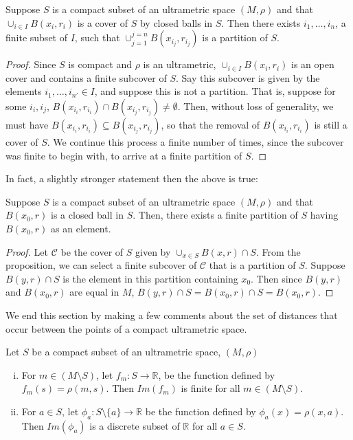 \begin{proposition}
Suppose $S$ is a compact subset of an ultrametric space $(M, \rho)$ and that $\cup_{i \in I} B(x_i,r_i)$ is a cover of $S$ by closed balls in $S$. Then there exists $i_1,\ldots, i_n$, a finite subset of $I$, such that  $\cup_{j=1}^{j=n} B(x_{i_j},r_{i_j})$ is a partition of $S$.
\end{proposition}

\begin{proof}
Since $S$ is compact and $\rho$ is an ultrametric, $\cup_{i \in I} B(x_i,r_i)$ is an open cover and contains a finite subcover of $S$. Say this subcover is given by the elements  $i_1,\ldots, i_{n'} \in I$, and suppose this is not a partition. That is, suppose for some $i_i, i_j$, $ B(x_{i_i},r_{i_i}) \cap  B(x_{i_j},r_{i_j}) \neq \emptyset$. Then, without loss of generality, we must have $ B(x_{i_i},r_{i_i}) \subseteq  B(x_{i_j},r_{i_j})$, so that the removal of $ B(x_{i_i},r_{i_i})$ is still a cover of $S$. We continue this process a finite number of times, since the subcover was finite to begin with, to arrive at a finite partition of $S$.
\end{proof}

In fact, a slightly stronger statement then the above is true:\\

\begin{corollary}
Suppose $S$ is a compact subset of an ultrametric space $(M, \rho)$ and that $B(x_0,r)$ is a closed ball in $S$. Then, there exists a finite partition of $S$ having $B(x_0,r)$ as an element.
\end{corollary}

\begin{proof}
Let $\mathcal{C}$ be the cover of $S$ given by $\cup_{x\in S} B(x,r) \cap S$. From the proposition, we can select a finite subcover of $\mathcal{C}$ that is a partition of $S$. Suppose $B(y,r) \cap S$ is the element in this partition containing $x_0$. Then  since $B(y,r)$ and $B(x_0,r)$ are equal in $M$, $B(y,r) \cap S = B(x_0,r) \cap S = B(x_0,r)$.
\end{proof}

We end this section by making a few comments about the set of distances that occur between the points of a compact ultrametric space.\\

\begin{proposition}
\cite{ar} Let $S$ be a compact subset of an ultrametric space, $(M, \rho)$
\begin{enumerate}[(i)]
\item For $m \in (M \setminus S)$, let $f_m:S \rightarrow \mathbb{R}$, be the function defined by $f_m(s) = \rho(m,s)$. Then $Im(f_m)$ is finite for all $m \in (M \setminus S)$.
\item For $a \in S$, let $\phi_a: S \setminus \{a\} \rightarrow \mathbb{R}$ be the function defined by $\phi_a(x)=\rho(x,a)$. Then $Im(\phi_a)$ is a discrete subset of $\mathbb{R}$ for all $a \in S$.
\end{enumerate}
\end{proposition}

